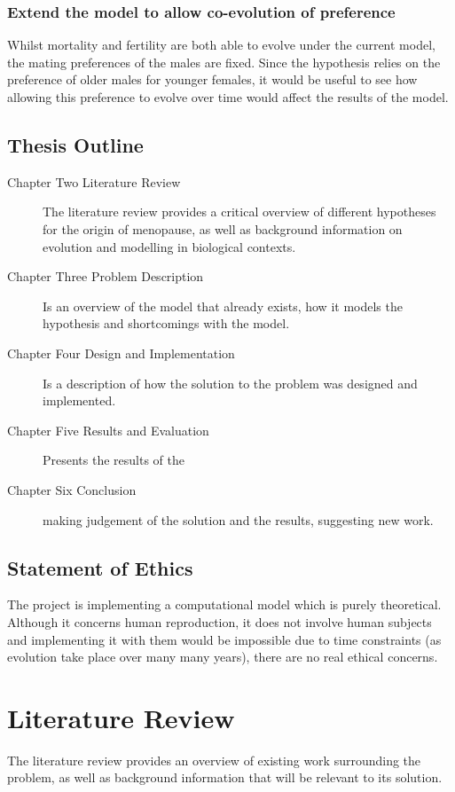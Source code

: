 \documentclass[authoryearcitations]{UoYCSproject}
\begin{document}
\subsection{Extend the model to allow co-evolution of preference}
Whilst mortality and fertility are both able to evolve under the current model, the mating preferences of the males are fixed. Since the hypothesis relies on the preference of older males for younger females, it would be useful to see how allowing this preference to evolve over time would affect the results of the model.

\section{Thesis Outline}
\begin{description}

\item[Chapter Two Literature Review] The literature review provides a critical overview of different hypotheses for the origin of menopause, as well as background information on evolution and modelling in biological contexts.
\item[Chapter Three Problem Description] Is an overview of the model that already exists, how it models the hypothesis and shortcomings with the model.
\item[Chapter Four Design and Implementation] Is a description of how the solution to the problem was designed and implemented.

\item[Chapter Five Results and Evaluation] Presents the results of the 

\item[Chapter Six Conclusion] making judgement of the solution and the results, suggesting new work.

\end{description}

\section{Statement of Ethics}
The project is implementing a computational model which is purely theoretical. Although it concerns human reproduction, it does not involve human subjects and implementing it with them would be impossible due to time constraints (as evolution take place over many many years), there are no real ethical concerns.

\chapter{Literature Review}
\label{cha:Literature Review}
The literature review provides an overview of existing work surrounding the problem, as well as background information that will be relevant to its solution. 
\end{document}
